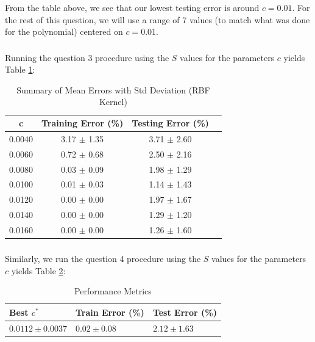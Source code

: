 \documentclass[final,3p,times,12pt]{article}
\begin{document}
From the table above, we see that our lowest testing error is around $c=0.01$. For the rest of this question, we will use a range of 7 values (to match what was done for the polynomial) centered on $c=0.01$. 

\subsubsection{}

Running the question 3 procedure using the $S$ values for the parameters $c$ yields Table \ref{tab:7b}:

\begin{table}[H]
\centering
\caption{Summary of Mean Errors with Std Deviation (RBF Kernel)}
\label{tab:7b}
\begin{tabular}{cccc}
\toprule
\textbf{c} & \textbf{Training Error (\%)} & \textbf{Testing Error (\%)} \\
\midrule
0.0040 & 3.17 $\pm$ 1.35 & 3.71 $\pm$ 2.60 \\
0.0060 & 0.72 $\pm$ 0.68 & 2.50 $\pm$ 2.16 \\
0.0080 & 0.03 $\pm$ 0.09 & 1.98 $\pm$ 1.29 \\
0.0100 & 0.01 $\pm$ 0.03 & 1.14 $\pm$ 1.43 \\
0.0120 & 0.00 $\pm$ 0.00 & 1.97 $\pm$ 1.67 \\
0.0140 & 0.00 $\pm$ 0.00 & 1.29 $\pm$ 1.20 \\
0.0160 & 0.00 $\pm$ 0.00 & 1.26 $\pm$ 1.60 \\
\bottomrule
\end{tabular}
\end{table}

\subsubsection{}

Similarly, we run the question 4 procedure using the $S$ values for the parameters $c$ yields Table \ref{tab:metrics_c}:

\begin{table}[H]
\centering
\begin{tabular}{@{}lll@{}}
\toprule
\textbf{Best $c^*$} & \textbf{Train Error (\%)} & \textbf{Test Error (\%)} \\ \midrule
$0.0112 \pm 0.0037$     & $0.02 \pm 0.08$          & $2.12 \pm 1.63$          \\ \bottomrule
\end{tabular}
\caption{Performance Metrics}
\label{tab:metrics_c}
\end{table}
\end{document}
